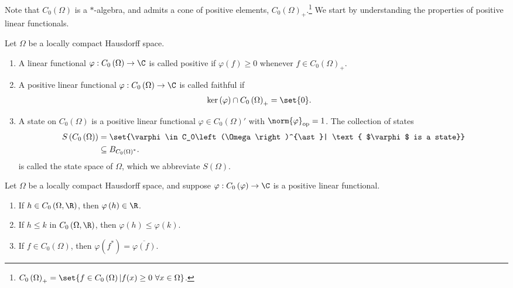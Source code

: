 \documentclass[10pt]{mypackage}
\begin{document}
Note that $C_0\left(\Omega\right)$ is a $\ast$-algebra, and admits a cone of positive elements, $C_0\left(\Omega\right)_{+}$.\footnote{$C_0\left(\Omega\right)_{+} = \set{f\in C_0\left(\Omega\right)| f(x)\geq 0~\forall x\in \Omega}$.} We start by understanding the properties of positive linear functionals.
\begin{definition}
  Let $\Omega$ be a locally compact Hausdorff space.
  \begin{enumerate}[(1)]
    \item A linear functional $\varphi: C_0\left(\Omega\right)\rightarrow \C$ is called positive if $\varphi(f) \geq 0$ whenever $f\in C_0\left(\Omega\right)_{+}$.
    \item A positive linear functional $\varphi: C_0\left(\Omega\right)\rightarrow \C$ is called faithful if
      \begin{align*}
        \ker\left(\varphi\right)\cap C_0\left(\Omega\right)_{+} &= \set{0}.
      \end{align*}
    \item A state on $C_0\left(\Omega\right)$ is a positive linear functional $\varphi\in C_0\left(\Omega\right)'$ with $\norm{\varphi}_{\text{op}} = 1$. The collection of states
      \begin{align*}
        S\left(C_0\left(\Omega\right)\right) &= \set{\varphi\in C_0\left(\Omega\right)^{\ast}| \text{ $\varphi$ is a state}}\\
                                             &\subseteq B_{C_{0}\left(\Omega\right)^{\ast}}.
      \end{align*}
      is called the state space of $\Omega$, which we abbreviate $S\left(\Omega\right)$.
  \end{enumerate}
\end{definition}
\begin{lemma}
  Let $\Omega$ be a locally compact Hausdorff space, and suppose $\varphi: C_0\left(\varphi\right)\rightarrow \C$ is a positive linear functional.
  \begin{enumerate}[(1)]
    \item If $h\in C_0\left(\Omega,\R\right)$, then $\varphi\left(h\right)\in \R$.
    \item If $h\leq k$ in $C_0\left(\Omega,\R\right)$, then $\varphi\left(h\right) \leq \varphi\left(k\right)$.
    \item If $f\in C_0\left(\Omega\right)$, then $\varphi\left(f^{\ast}\right) = \overline{\varphi\left(f\right)}$.
  \end{enumerate}
\end{lemma}
\end{document}

